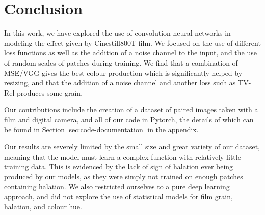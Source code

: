 \section{Conclusion}
\label{sec:conclusion}



In this work, we have explored the use of convolution neural networks in modeling the effect given by Cinestill800T film. We focused on the use of different loss functions as well as the addition of a noise channel to the input, and the use of random scales of patches during training. We find that a combination of MSE/VGG gives the best colour production which is significantly helped by resizing, and that the addition of a noise channel and another loss such as TV-Rel produces some grain.

Our contributions include the creation of a dataset of paired images taken with a film and digital camera, and all of our code in Pytorch, the details of which can be found in Section \ref{sec:code-documentation} in the appendix.


Our results are severely limited by the small size and great variety of our dataset, meaning that the model must learn a complex function with relatively little training data. This is evidenced by the lack of sign of halation ever being produced by our models, as they were simply not trained on enough patches containing halation. We also restricted ourselves to a pure deep learning approach, and did not explore the use of statistical models for film grain, halation, and colour hue.


